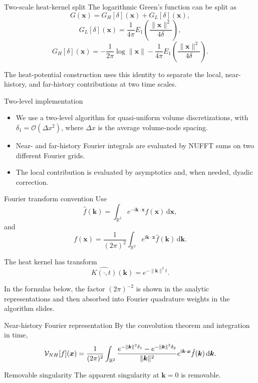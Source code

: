 \documentclass[aspectratio=169,11pt]{beamer}
\newcommand{\R}{\mathbb{R}}
\newcommand{\cO}{\mathcal{O}}
\newcommand{\dd}{\,\mathrm d}
\newcommand{\ii}{\mathrm i}
\newcommand{\x}{\bm{x}}
\newcommand{\kvec}{\bm{k}}
\begin{document}
\begin{frame}{Two-scale heat-kernel split}
\small
The logarithmic Green's function can be split as
\[
  G(\x)=G_H[\delta](\x)+G_L[\delta](\x),
\]
\[
  G_L[\delta](\x)=\frac{1}{4\pi}
  E_1\!\left(\frac{\|\x\|^2}{4\delta}\right),
\]
\[
  G_H[\delta](\x)=
  -\frac{1}{2\pi}\log\|\x\|
  -
  \frac{1}{4\pi}
  E_1\!\left(\frac{\|\x\|^2}{4\delta}\right).
\]

The heat-potential construction uses this identity to separate the local,
near-history, and far-history contributions at two time scales.
\end{frame}

\begin{frame}{Two-level implementation}
\small
\begin{itemize}
  \item We use a two-level algorithm for quasi-uniform volume
  discretizations, with $\delta_1=\cO(\Delta x^2)$, where $\Delta x$ is
  the average volume-node spacing.
  \item Near- and far-history Fourier integrals are evaluated by NUFFT sums on
  two different Fourier grids.
  \item The local contribution is evaluated by asymptotics and, when needed,
  dyadic correction.
\end{itemize}
\end{frame}

\begin{frame}{Fourier transform convention}
\small
Use
\[
  \hat f(\kvec)=
  \int_{\R^2}e^{-\ii\kvec\cdot\x}f(\x)\dd\x,
\]
and
\[
  f(\x)=\frac{1}{(2\pi)^2}
  \int_{\R^2}e^{\ii\kvec\cdot\x}\hat f(\kvec)\dd\kvec.
\]

The heat kernel has transform
\[
  \widehat{K(\cdot,t)}(\kvec)=e^{-\|\kvec\|^2t}.
\]

\vspace{1mm}
In the formulas below, the factor $(2\pi)^{-2}$ is shown in the analytic
representations and then absorbed into Fourier quadrature weights in the
algorithm slides.
\end{frame}

\begin{frame}{Near-history Fourier representation}
\small
By the convolution theorem and integration in time,
\[
  \Vop_{NH}[f](\x)
  =
  \frac{1}{(2\pi)^2}
  \int_{\R^2}
  \frac{
    e^{-\|\kvec\|^2\delta_1}
    -
    e^{-\|\kvec\|^2\delta_2}
  }{\|\kvec\|^2}
  e^{\ii\kvec\cdot\x}\hat f(\kvec)\dd\kvec.
\]

\begin{block}{Removable singularity}
The apparent singularity at $\kvec=0$ is removable.
\end{block}
\end{frame}
\end{document}
